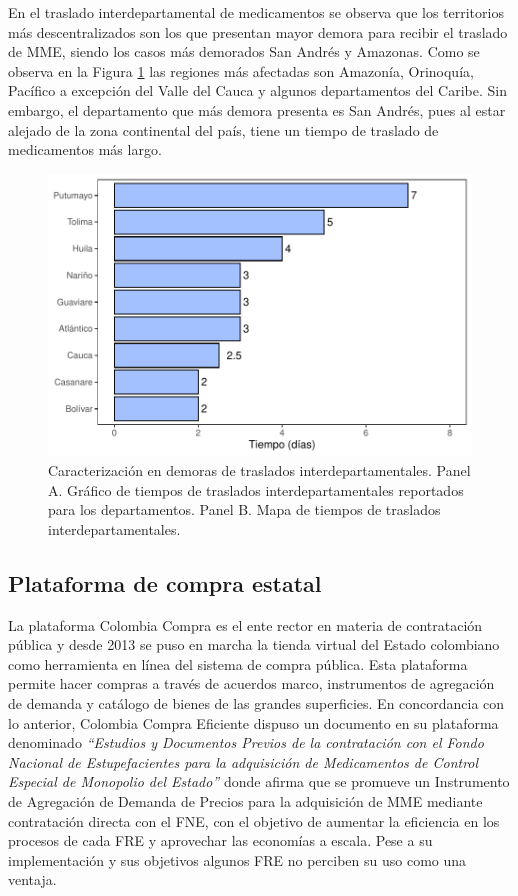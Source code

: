 \documentclass[
]{book}
\begin{document}
En el traslado interdepartamental de medicamentos se observa que los territorios más descentralizados son los que presentan mayor demora para recibir el traslado de MME, siendo los casos más demorados San Andrés y Amazonas. Como se observa en la Figura \ref{fig:TiemposTranslados} las regiones más afectadas son Amazonía, Orinoquía, Pacífico a excepción del Valle del Cauca y algunos departamentos del Caribe. Sin embargo, el departamento que más demora presenta es San Andrés, pues al estar alejado de la zona continental del país, tiene un tiempo de traslado de medicamentos más largo.

\begin{figure}
\includegraphics[width=1\linewidth]{InformeFinal_files/figure-latex/TiemposTranslados-1} \caption{Caracterización en demoras de traslados interdepartamentales. Panel A. Gráfico de tiempos de traslados interdepartamentales reportados para los departamentos. Panel B. Mapa de tiempos de traslados interdepartamentales.}\label{fig:TiemposTranslados}
\end{figure}

\hypertarget{plataforma-de-compra-estatal}{%
\subsection{Plataforma de compra estatal}\label{plataforma-de-compra-estatal}}

La plataforma Colombia Compra es el ente rector en materia de contratación pública y desde 2013 se puso en marcha la tienda virtual del Estado colombiano como herramienta en línea del sistema de compra pública. Esta plataforma permite hacer compras a través de acuerdos marco, instrumentos de agregación de demanda y catálogo de bienes de las grandes superficies. En concordancia con lo anterior, Colombia Compra Eficiente dispuso un documento en su plataforma denominado \emph{``Estudios y Documentos Previos de la contratación con el Fondo Nacional de Estupefacientes para la adquisición de Medicamentos de Control Especial de Monopolio del Estado''} donde afirma que se promueve un Instrumento de Agregación de Demanda de Precios para la adquisición de MME mediante contratación directa con el FNE, con el objetivo de aumentar la eficiencia en los procesos de cada FRE y aprovechar las economías a escala. Pese a su implementación y sus objetivos algunos FRE no perciben su uso como una ventaja.
\end{document}
